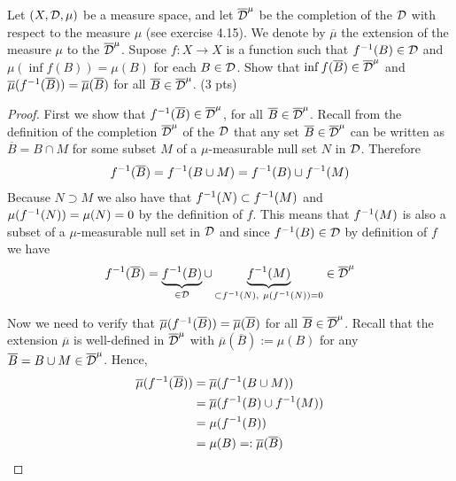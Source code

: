 \begin{ex}
	Let $(X, \mathcal{D}, \mu)$ be a measure space, and let $\overline{\mathcal{D}}^\mu$ be the completion of the \siga $\mathcal{D}$ with respect to the measure $\mu$ (see exercise 4.15). We denote by $\overline{\mu}$ the extension of the measure $\mu$ to the \siga $\overline{\mathcal{D}}^\mu$. Supose $f: X \to X$ is a function such that $f^{-1}(B) \in \mathcal{D}$ and $\mu(\inf{f}(B)) = \mu(B)$ for each $B \in \mathcal{D}$. Show that $\inf{f}(\overline{B}) \in \overline{\mathcal{D}}^\mu$ and $\overline{\mu}(f^{-1}(\overline{B})) = \overline{\mu}(\overline{B})$ for all $\overline{B} \in \overline{\mathcal{D}}^\mu$. (3 pts)
\end{ex}

\begin{proof}
	First we show that $f^{-1}(\overline{B}) \in \overline{\mathcal{D}}^\mu$, for all $\overline{B} \in \overline{\mathcal{D}}^\mu$. Recall from the definition of the completion $\overline{\mathcal{D}}^\mu$ of the \siga $\mathcal{D}$ that any set $\overline{B} \in \overline{\mathcal{D}}^\mu$ can be written as $\overline{B} = B \cap M$ for some subset $M$ of a $\mu$-measurable null set $N$ in $\mathcal{D}$. Therefore
	\begin{align*}
		f^{-1}(\overline{B}) = f^{-1}(B \cup M) = f^{-1}(B) \cup f^{-1}(M)
	\end{align*}
	Because $N \supset M$ we also have that $f^{-1}(N) \subset f^{-1}(M)$ and $\mu(f^{-1}(N)) = \mu(N) = 0$ by the definition of $f$. This means that $f^{-1}(M)$ is also a subset of a $\mu$-measurable null set in $\mathcal{D}$ and since $f^{-1}(B) \in \mathcal{D}$ by definition of $f$ we have
	\begin{align*}
		f^{-1}(\overline{B}) = \underbrace{f^{-1}(B)}_{\in \mathcal{D}} \cup \underbrace{f^{-1}(M)}_{\subset f^{-1}(N),\ \mu(f^{-1}(N)) = 0} \in \overline{\mathcal{D}}^\mu
	\end{align*}
	
	Now we need to verify that $\overline{\mu}(f^{-1}(\overline{B})) = \overline{\mu}(\overline{B})$ for all $\overline{B} \in \overline{\mathcal{D}}^\mu$. Recall that the extension $\overline{\mu}$ is well-defined in $\overline{\mathcal{D}}^\mu$ with $\overline{\mu}(\overline{B}) := \mu(B)$ for any $\overline{B} = B \cup M \in \overline{\mathcal{D}}^\mu$. Hence,
	\begin{align*}
		\overline{\mu}(f^{-1}(\overline{B}))
		&= \overline{\mu}(f^{-1}(B \cup M)) \\
		&= \overline{\mu}(f^{-1}(B) \cup f^{-1}(M)) \\
		&= \mu(f^{-1}(B)) \\
		&= \mu(B) =: \overline{\mu}(\overline{B})
	\end{align*}
\end{proof}

